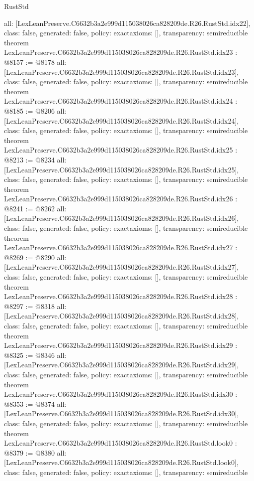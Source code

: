 \begin{lexlean}{RustStd}
\begin{coremodule}
{  all: [LexLeanPreserve.C6632b3a2e999d115038026ca828209de.R26.RustStd.idx22],
  class: false,
  generated: false,
  policy: exact{axioms: []},
  transparency: semireducible
}
theorem LexLeanPreserve.C6632b3a2e999d115038026ca828209de.R26.RustStd.idx23 : @8157 := @8178 {
  all: [LexLeanPreserve.C6632b3a2e999d115038026ca828209de.R26.RustStd.idx23],
  class: false,
  generated: false,
  policy: exact{axioms: []},
  transparency: semireducible
}
theorem LexLeanPreserve.C6632b3a2e999d115038026ca828209de.R26.RustStd.idx24 : @8185 := @8206 {
  all: [LexLeanPreserve.C6632b3a2e999d115038026ca828209de.R26.RustStd.idx24],
  class: false,
  generated: false,
  policy: exact{axioms: []},
  transparency: semireducible
}
theorem LexLeanPreserve.C6632b3a2e999d115038026ca828209de.R26.RustStd.idx25 : @8213 := @8234 {
  all: [LexLeanPreserve.C6632b3a2e999d115038026ca828209de.R26.RustStd.idx25],
  class: false,
  generated: false,
  policy: exact{axioms: []},
  transparency: semireducible
}
theorem LexLeanPreserve.C6632b3a2e999d115038026ca828209de.R26.RustStd.idx26 : @8241 := @8262 {
  all: [LexLeanPreserve.C6632b3a2e999d115038026ca828209de.R26.RustStd.idx26],
  class: false,
  generated: false,
  policy: exact{axioms: []},
  transparency: semireducible
}
theorem LexLeanPreserve.C6632b3a2e999d115038026ca828209de.R26.RustStd.idx27 : @8269 := @8290 {
  all: [LexLeanPreserve.C6632b3a2e999d115038026ca828209de.R26.RustStd.idx27],
  class: false,
  generated: false,
  policy: exact{axioms: []},
  transparency: semireducible
}
theorem LexLeanPreserve.C6632b3a2e999d115038026ca828209de.R26.RustStd.idx28 : @8297 := @8318 {
  all: [LexLeanPreserve.C6632b3a2e999d115038026ca828209de.R26.RustStd.idx28],
  class: false,
  generated: false,
  policy: exact{axioms: []},
  transparency: semireducible
}
theorem LexLeanPreserve.C6632b3a2e999d115038026ca828209de.R26.RustStd.idx29 : @8325 := @8346 {
  all: [LexLeanPreserve.C6632b3a2e999d115038026ca828209de.R26.RustStd.idx29],
  class: false,
  generated: false,
  policy: exact{axioms: []},
  transparency: semireducible
}
theorem LexLeanPreserve.C6632b3a2e999d115038026ca828209de.R26.RustStd.idx30 : @8353 := @8374 {
  all: [LexLeanPreserve.C6632b3a2e999d115038026ca828209de.R26.RustStd.idx30],
  class: false,
  generated: false,
  policy: exact{axioms: []},
  transparency: semireducible
}
theorem LexLeanPreserve.C6632b3a2e999d115038026ca828209de.R26.RustStd.look0 : @8379 := @8380 {
  all: [LexLeanPreserve.C6632b3a2e999d115038026ca828209de.R26.RustStd.look0],
  class: false,
  generated: false,
  policy: exact{axioms: []},
  transparency: semireducible
}
\end{coremodule}
\end{lexlean}
